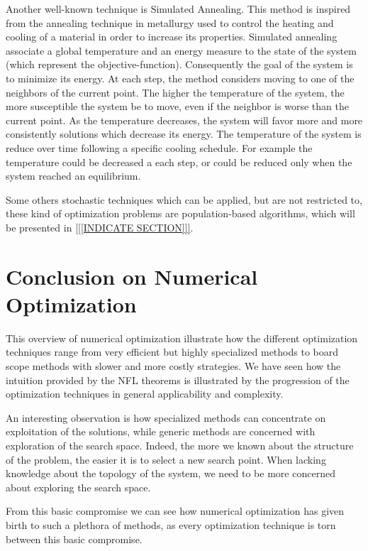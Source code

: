 Another well-known technique is Simulated Annealing. This method is inspired from the annealing technique in metallurgy used to control the heating and cooling of a material in order to increase its properties.
Simulated annealing associate a global temperature and an energy measure to the state of the system (which represent the objective-function). Consequently the goal of the system is to minimize its energy. At each step, the method considers moving to one of the neighbors of the current point. The higher the temperature of the system, the more susceptible the system be to move, even if the neighbor is worse than the current point. As the temperature decreases, the system will favor more and more consistently solutions which decrease its energy.
The temperature of the system is reduce over time following a specific cooling schedule. For example the temperature could be decreased a each step, or could be reduced only when the system reached an equilibrium.

Some others stochastic techniques which can be applied, but are not restricted to, these kind of optimization problems are population-based algorithms, which will be presented in \ref{[[INDICATE SECTION]]}.

\section{Conclusion on Numerical Optimization}

This overview of numerical optimization illustrate how the different optimization techniques range from very efficient but highly specialized methods to board scope methods with slower and more costly strategies.
We have seen how the intuition provided by the NFL theorems is illustrated by the progression of the optimization techniques in general applicability and complexity.

An interesting observation is how specialized methods can concentrate on exploitation of the solutions, while generic methods are concerned with exploration of the search space. Indeed, the more we known about the structure of the problem, the easier it is to select a new search point. When lacking knowledge about the topology of the system, we need to be more concerned about exploring the search space.

From this basic compromise we can see how numerical optimization has given birth to such a plethora of methods, as every optimization technique is torn between this basic compromise.

